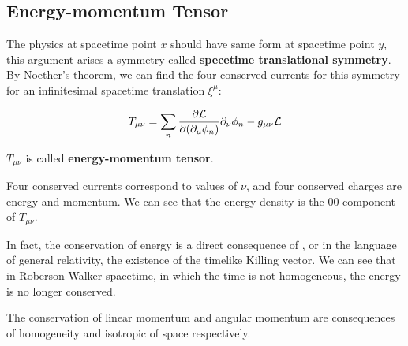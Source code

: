 \documentclass[../QFTCS_note.tex]{subfiles}
\numberwithin{equation}{subsection}
\begin{document}
\subsection{Energy-momentum Tensor}
The physics at spacetime point \(x\) should have same form at spacetime point \(y\),
this argument arises a symmetry called \textbf{specetime translational symmetry}.
By Noether's theorem, we can find the four conserved currents for this symmetry for an infinitesimal
spacetime translation \(\xi^\mu\):
\begin{definition}
  \[T_{\mu\nu}=\sum_n \frac{\partial \mathcal{L}}{\partial(\partial_{\mu}\phi_n)}\partial_\nu\phi_n-g_{\mu\nu}\mathcal{L}\]

  \(T_{\mu\nu}\) is called \textbf{energy-momentum tensor}.
\end{definition}
Four conserved currents correspond to values of \(\nu\), and four conserved charges are energy and momentum.
We can see that the energy density is the 00-component of \(T_{\mu\nu}\).
\begin{remark}
  In fact, the conservation of energy is a direct consequence of , or in the language of general relativity, the existence of the timelike Killing vector.
  We can see that in Roberson-Walker spacetime, in which the time is not homogeneous, the energy is no longer conserved.

  The conservation of linear momentum and angular momentum are consequences of homogeneity and isotropic of space respectively.
\end{remark}
\end{document}
